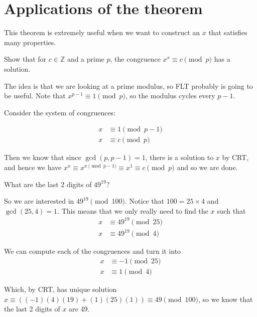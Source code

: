\documentclass{article}
\theoremstyle{mytheoremstyle}
\theoremstyle{mytheoremstyle}
\theoremstyle{myproblemstyle}
\begin{document}
    \section{Applications of the theorem}
    
    This theorem is extremely useful when we want to construct an $x$ that satisfies many properties. 

    \begin{problem}
        Show that for $c \in \mathbb{Z}$ and a prime $p$, the congruence $x^x \equiv c \pmod{p}$ has a solution. 
    \end{problem}

    The idea is that we are looking at a prime modulus, so FLT probably is going to be useful. Note that $x^{p-1} \equiv 1 \pmod{p}$, so the modulus cycles every $p-1$. 

    Consider the system of congruences: 

    \begin{align*}
        x &\equiv 1 \pmod{p-1} \\
        x &\equiv c \pmod{p}
    \end{align*}

    Then we know that since $\gcd{(p, p-1)} = 1$, there is a solution to $x$ by CRT, and hence we have $x^x \equiv x^{x \pmod{p-1}} \equiv x^1 \equiv c \pmod{p}$ and so we are done.

    \begin{problem}
        What are the last 2 digits of $49^{19}$?
    \end{problem}

    So we are interested in $49^{19} \pmod{100}$. Notice that $100 = 25 \times 4$ and $\gcd(25, 4) = 1$. This means that we only really need to find the $x$ such that 
    \begin{align*}
        x &\equiv 49^{19} \pmod{25} \\
        x &\equiv 49^{19} \pmod{4}
    \end{align*}

    We can compute each of the congruences and turn it into 
    \begin{align*}
        x &\equiv -1 \pmod{25} \\
        x &\equiv 1 \pmod{4}
    \end{align*}

    Which, by CRT, has unique solution $x \equiv ((-1)(4)(19) + (1)(25)(1)) \equiv 49 \pmod{100}$, so we know that the last 2 digits of $x$ are 49. 









    
\end{document}
